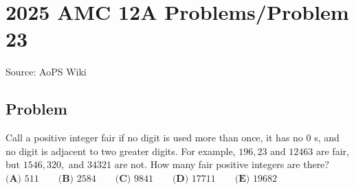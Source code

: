 \documentclass[12pt]{article}
\begin{document}
\section*{{2025 AMC 12A Problems/Problem 23}}
Source: AoPS Wiki

\subsection*{Problem}
Call a positive integer fair if no digit is used more than once, it has no $0$ s, and no digit is adjacent to two greater digits. For example, $196, 23$ and $12463$ are fair, but $1546, 320,$ and $34321$ are not. How many fair positive integers are there? $\textbf{(A) } 511 \qquad \textbf{(B) } 2584 \qquad \textbf{(C) } 9841 \qquad \textbf{(D) } 17711 \qquad \textbf{(E) } 19682$
\end{document}
